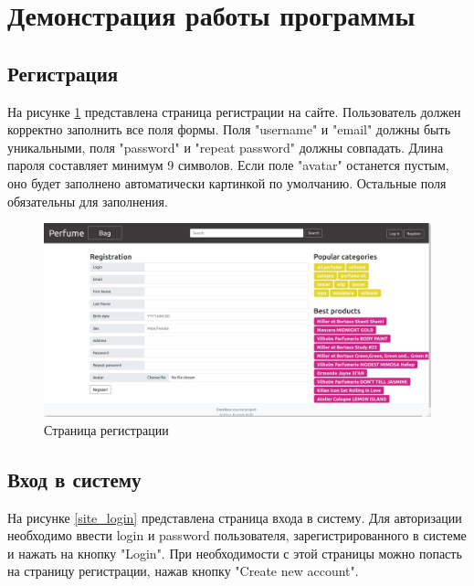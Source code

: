 \newpage

\section{Демонстрация работы программы}

\subsection{Регистрация}

На рисунке \ref{site_reg} представлена страница регистрации на сайте. Пользователь должен корректно заполнить все поля формы. Поля "username" и "email" \newline должны быть уникальными, поля "password" и "repeat password" должны совпадать. Длина пароля составляет минимум 9 символов. Если поле "avatar" \newline останется пустым, оно будет заполнено автоматически картинкой по умолчанию. Остальные поля обязательны для заполнения.

\captionsetup{singlelinecheck = false, justification=centering}
\begin{figure}[h!]
	\begin{center}
		\includegraphics[scale=0.45]{assets/site_reg.jpg}
	\end{center}
	\caption{Страница регистрации}
	\label{site_reg}
\end{figure}

\subsection{Вход в систему}

На рисунке \ref{site_login} представлена страница входа в систему. Для авторизации необходимо ввести login и password пользователя, зарегистрированного в системе и нажать на кнопку "Login". При необходимости с этой страницы можно попасть на страницу регистрации, нажав кнопку "Create new account".

